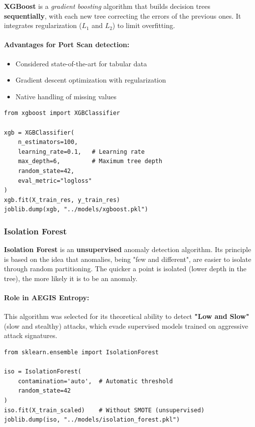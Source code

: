 \textbf{XGBoost} is a \textit{gradient boosting} algorithm that builds decision trees \textbf{sequentially}, with each new tree correcting the errors of the previous ones. It integrates regularization ($L_1$ and $L_2$) to limit overfitting.

\paragraph{Advantages for Port Scan detection:}
\begin{itemize}
    \item Considered state-of-the-art for tabular data
    \item Gradient descent optimization with regularization
    \item Native handling of missing values
\end{itemize}

\begin{lstlisting}[caption={XGBoost Training}]
from xgboost import XGBClassifier

xgb = XGBClassifier(
    n_estimators=100,
    learning_rate=0.1,   # Learning rate
    max_depth=6,         # Maximum tree depth
    random_state=42,
    eval_metric="logloss"
)
xgb.fit(X_train_res, y_train_res)
joblib.dump(xgb, "../models/xgboost.pkl")
\end{lstlisting}

\subsubsection{Isolation Forest}

\textbf{Isolation Forest} is an \textbf{unsupervised} anomaly detection algorithm. Its principle is based on the idea that anomalies, being "few and different", are easier to isolate through random partitioning. The quicker a point is isolated (lower depth in the tree), the more likely it is to be an anomaly.

\paragraph{Role in AEGIS Entropy:} This algorithm was selected for its theoretical ability to detect \textbf{"Low and Slow"} (slow and stealthy) attacks, which evade supervised models trained on aggressive attack signatures.

\begin{lstlisting}[caption={Isolation Forest Training}]
from sklearn.ensemble import IsolationForest

iso = IsolationForest(
    contamination='auto',  # Automatic threshold
    random_state=42
)
iso.fit(X_train_scaled)    # Without SMOTE (unsupervised)
joblib.dump(iso, "../models/isolation_forest.pkl")
\end{lstlisting}

